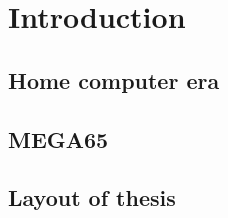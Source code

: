 

\chapter{Introduction} %
\label{Chapter1} %

\section{Home computer era}


\section{MEGA65}


\section{Layout of thesis}
